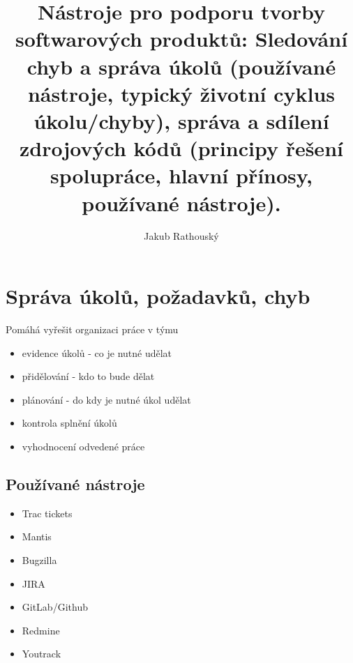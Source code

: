 \documentclass{szzclass}
\title{Nástroje pro podporu tvorby softwarových produktů: Sledování chyb a správa úkolů (používané nástroje, typický životní cyklus úkolu/chyby),
 správa a sdílení zdrojových kódů (principy řešení spolupráce, hlavní přínosy, používané nástroje).}
\author{Jakub Rathouský}
\begin{document}
\maketitle
\tableofcontents
\newpage

\section{Správa úkolů, požadavků, chyb}
Pomáhá vyřešit organizaci práce v týmu
\begin{itemize}
    \item evidence úkolů - co je nutné udělat
    \item přidělování - kdo to bude dělat
    \item plánování - do kdy je nutné úkol udělat
    \item kontrola splnění úkolů
    \item vyhodnocení odvedené práce
\end{itemize}
\subsection{Používané nástroje}
\begin{itemize}
    \item Trac tickets
    \item Mantis
    \item Bugzilla
    \item JIRA
    \item GitLab/Github
    \item Redmine
    \item Youtrack
\end{itemize}
\end{document}
